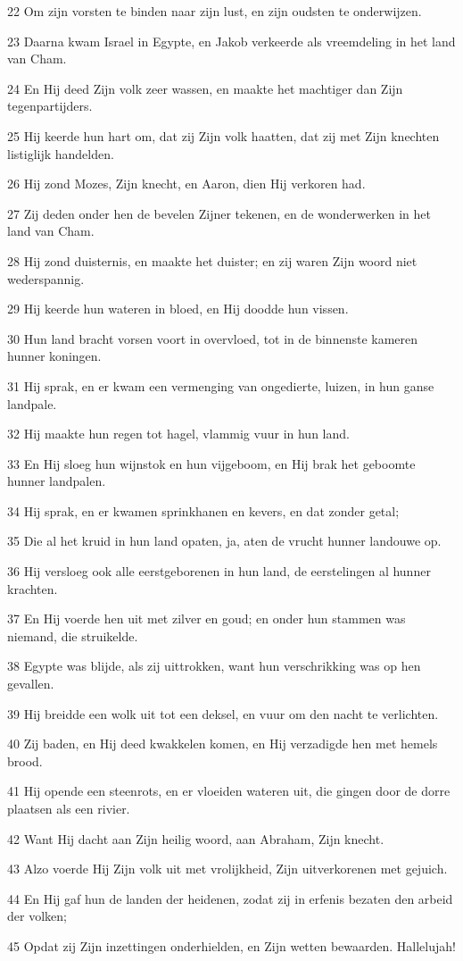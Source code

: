 \par 22 Om zijn vorsten te binden naar zijn lust, en zijn oudsten te onderwijzen.
\par 23 Daarna kwam Israel in Egypte, en Jakob verkeerde als vreemdeling in het land van Cham.
\par 24 En Hij deed Zijn volk zeer wassen, en maakte het machtiger dan Zijn tegenpartijders.
\par 25 Hij keerde hun hart om, dat zij Zijn volk haatten, dat zij met Zijn knechten listiglijk handelden.
\par 26 Hij zond Mozes, Zijn knecht, en Aaron, dien Hij verkoren had.
\par 27 Zij deden onder hen de bevelen Zijner tekenen, en de wonderwerken in het land van Cham.
\par 28 Hij zond duisternis, en maakte het duister; en zij waren Zijn woord niet wederspannig.
\par 29 Hij keerde hun wateren in bloed, en Hij doodde hun vissen.
\par 30 Hun land bracht vorsen voort in overvloed, tot in de binnenste kameren hunner koningen.
\par 31 Hij sprak, en er kwam een vermenging van ongedierte, luizen, in hun ganse landpale.
\par 32 Hij maakte hun regen tot hagel, vlammig vuur in hun land.
\par 33 En Hij sloeg hun wijnstok en hun vijgeboom, en Hij brak het geboomte hunner landpalen.
\par 34 Hij sprak, en er kwamen sprinkhanen en kevers, en dat zonder getal;
\par 35 Die al het kruid in hun land opaten, ja, aten de vrucht hunner landouwe op.
\par 36 Hij versloeg ook alle eerstgeborenen in hun land, de eerstelingen al hunner krachten.
\par 37 En Hij voerde hen uit met zilver en goud; en onder hun stammen was niemand, die struikelde.
\par 38 Egypte was blijde, als zij uittrokken, want hun verschrikking was op hen gevallen.
\par 39 Hij breidde een wolk uit tot een deksel, en vuur om den nacht te verlichten.
\par 40 Zij baden, en Hij deed kwakkelen komen, en Hij verzadigde hen met hemels brood.
\par 41 Hij opende een steenrots, en er vloeiden wateren uit, die gingen door de dorre plaatsen als een rivier.
\par 42 Want Hij dacht aan Zijn heilig woord, aan Abraham, Zijn knecht.
\par 43 Alzo voerde Hij Zijn volk uit met vrolijkheid, Zijn uitverkorenen met gejuich.
\par 44 En Hij gaf hun de landen der heidenen, zodat zij in erfenis bezaten den arbeid der volken;
\par 45 Opdat zij Zijn inzettingen onderhielden, en Zijn wetten bewaarden. Hallelujah!

